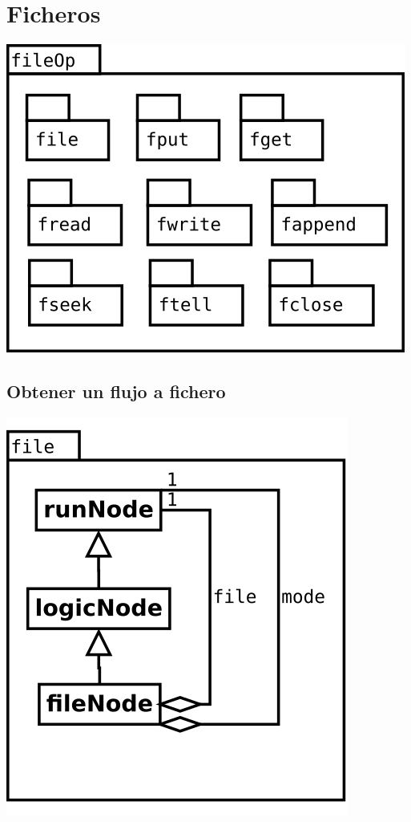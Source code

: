 \pagebreak
\section {Ficheros} 
\begin{center}
\includegraphics[scale=0.4]{fileOp-package.png} \\
\end{center}

\subsection {Obtener un flujo a fichero} 
\begin{center}
\includegraphics[scale=0.4]{file.png} \\
\end{center}

